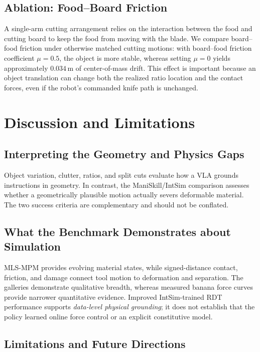 \FloatBarrier

\subsection{Ablation: Food--Board Friction}
\label{subsec:cut_ablation_friction}

A single-arm cutting arrangement relies on the interaction between the food and cutting board to keep the food from moving with the blade. We compare board--food friction under otherwise matched cutting motions: with board--food friction coefficient $\mu=0.5$, the object is more stable, whereas setting $\mu=0$ yields approximately $0.034$\,m of center-of-mass drift. This effect is important because an object translation can change both the realized ratio location and the contact forces, even if the robot's commanded knife path is unchanged.

\FloatBarrier

\section{Discussion and Limitations}
\label{sec:cut_discussion}

\subsection{Interpreting the Geometry and Physics Gaps}
Object variation, clutter, ratios, and split cuts evaluate how a VLA grounds instructions in geometry. In contrast, the ManiSkill/IntSim comparison assesses whether a geometrically plausible motion actually severs deformable material. The two success criteria are complementary and should not be conflated.

\subsection{What the Benchmark Demonstrates about Simulation}
MLS-MPM provides evolving material states, while signed-distance contact, friction, and damage connect tool motion to deformation and separation. The galleries demonstrate qualitative breadth, whereas measured banana force curves provide narrower quantitative evidence. Improved IntSim-trained RDT performance supports \emph{data-level physical grounding}; it does not establish that the policy learned online force control or an explicit constitutive model.

\subsection{Limitations and Future Directions}
